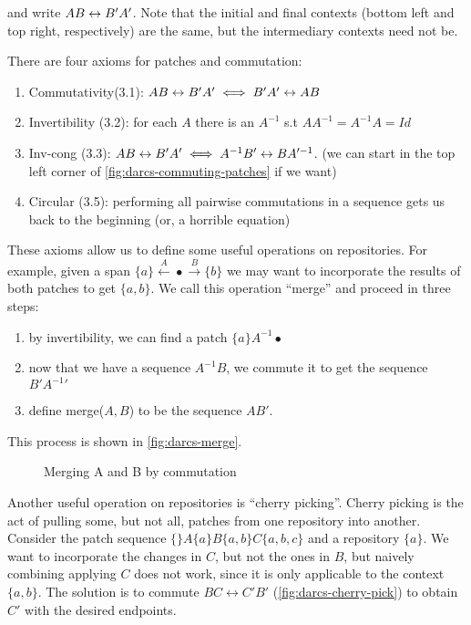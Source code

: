 and write $AB \leftrightarrow B'A'$. Note that the initial and final contexts (bottom left and top right,
respectively) are the same, but the intermediary contexts need not be.

There are four axioms for patches and commutation:
\begin{enumerate}
  \item Commutativity(3.1): $AB \leftrightarrow B'A' \iff B'A' \leftrightarrow AB$
  \item Invertibility (3.2): for each $A$ there is an $A^{-1}$ s.t
    $AA^{-1}=A^{-1}A=Id$
  \item Inv-cong (3.3): $AB \leftrightarrow B'A' \iff A^{-1}B' \leftrightarrow BA'^{-1}$. (we can
    start in the top left corner of \autoref{fig:darcs-commuting-patches} if we want)
    \label{axiom:darcs-inv-cong}
  \item Circular (3.5): performing all pairwise commutations in a sequence
    gets us back to the beginning (or, a horrible equation)
\end{enumerate}

These axioms allow us to define some useful operations on repositories. For
example, given a span $\{a\} \xleftarrow{A} \bullet \xrightarrow{B} \{b\}$ we
may want to incorporate the results of both patches to get $\{a,b\}$. We call
this operation ``merge'' and proceed in three steps:
\begin{enumerate}
\item by invertibility, we can find a patch $\{a\}A^{-1} \bullet$
\item now that we have a sequence $A^{-1}B$, we commute it to get the sequence $B'{A^{-1}}'$
\item define merge($A, B$) to be the sequence $AB'$.
\end{enumerate}
This process is shown in \autoref{fig:darcs-merge}.

\begin{figure}
\begin{center}
\end{center}
\caption{Merging A and B by commutation}
\label{fig:darcs-merge}
\end{figure}

Another useful operation on repositories is ``cherry picking''. Cherry picking
is the act of pulling some, but not all, patches from one repository into another.
Consider the patch sequence $\{\}A\{a\}B\{a,b\}C\{a,b,c\}$ and a repository
$\{a\}$. We want to incorporate the changes in $C$, but not the ones in $B$, but
naively combining applying $C$ does not work, since it is only applicable to the
context $\{a,b\}$. The solution is to commute $BC \leftrightarrow C'B'$ (\autoref{fig:darcs-cherry-pick}) to
obtain $C'$ with the desired endpoints.

